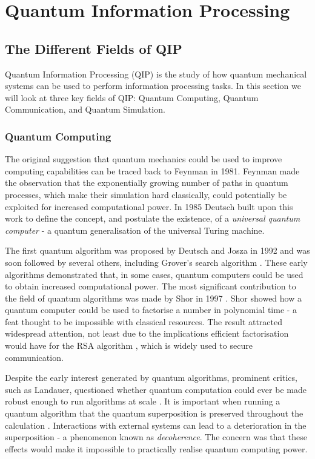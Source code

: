 \chapter{Quantum Information Processing} 
\label{ch:QuantumInformationProcessing}

\section{The Different Fields of QIP}

Quantum Information Processing (QIP) is the study of how quantum mechanical systems can be used to perform information processing tasks. In this section we will look at three key fields of QIP: Quantum Computing, Quantum Communication, and Quantum Simulation.

\subsection{Quantum Computing}

The original suggestion that quantum mechanics could be used to improve computing capabilities can be traced back to Feynman \cite{feynman_82} in 1981. Feynman made the observation that the exponentially growing number of paths in quantum processes, which make their simulation hard classically, could potentially be exploited for increased computational power. In 1985 Deutsch built upon this work to define the concept, and postulate the existence, of a \textit{universal quantum computer} \cite{deutsch_85} - a quantum generalisation of the universal Turing machine. 

The first quantum algorithm was proposed by Deutsch and Josza \cite{deutsch_jozsa_92} in 1992 and was soon followed by several others, including Grover's search algorithm \cite{simon_94, grovers_search}. These early algorithms demonstrated that, in some cases, quantum computers could be used to obtain increased computational power. The most significant contribution to the field of quantum algorithms was made by Shor in 1997 \cite{shors_algorithm}. Shor showed how a quantum computer could be used to factorise a number in polynomial time - a feat thought to be impossible with classical resources. The result attracted widespread attention, not least due to the implications efficient factorisation would have for the RSA algorithm \cite{rsa}, which is widely used to secure communication.

Despite the early interest generated by quantum algorithms, prominent critics, such as Landauer, questioned whether quantum computation could ever be made robust enough to run algorithms at scale \cite{landauer_96}. It is important when running a quantum algorithm that the quantum superposition is preserved throughout the calculation \cite{nature_cq_review_10}. Interactions with external systems can lead to a deterioration in the superposition - a phenomenon known as \textit{decoherence}. The concern was that these effects would make it impossible to practically realise quantum computing power.

